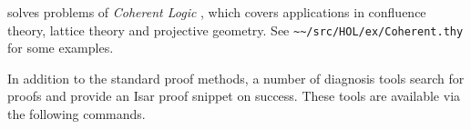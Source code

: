 \begin{isabellebody}
\begin{isamarkuptext}
  \begin{description}

  \item \hyperlink{method.HOL.coherent}{\mbox{}} solves problems of \emph{Coherent
  Logic} \cite{Bezem-Coquand:2005}, which covers applications in
  confluence theory, lattice theory and projective geometry.  See
  \verb|~~/src/HOL/ex/Coherent.thy| for some examples.

  \end{description}%
\end{isamarkuptext}%
\isamarkuptrue%
%
\isamarkuptrue%
%
\begin{isamarkuptext}%
In addition to the standard proof methods, a number of diagnosis
  tools search for proofs and provide an Isar proof snippet on success.
  These tools are available via the following commands.


\end{isamarkuptext}
\end{isabellebody}
